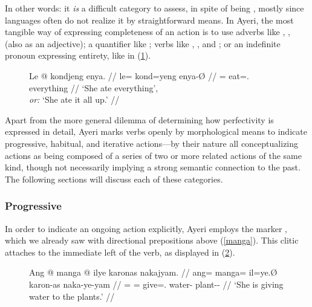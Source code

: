 In other words: it \emph{is} a difficult category to assess, in spite of being
,
mostly since languages often do not realize it by straightforward means. In
Ayeri, the most tangible way of expressing completeness of an action is to
use adverbs like , ,
 (also as an adjective); a quantifier like
; verbs like ,
, and ; or an indefinite
pronoun expressing entirety, like  in
(\ref{ex:entirepfv}).

\begin{figure}[h]
\ex\label{ex:entirepfv}\begingl
	\gla Le @ kondjeng enya. //
	\glb le= kond=yeng enya-Ø //
	\glc \PatTI{}= eat=\TsgF{}.\Aarg{} everything //
	\glft `She ate everything', \\
		\textit{or:} `She ate it all up.' //
\endgl\xe
\end{figure}

Apart from the more general dilemma of determining how perfectivity is
expressed in detail, Ayeri marks verbs openly by morphological means to
indicate progressive, habitual, and iterative actions---by their nature all
conceptualizing actions as being composed of a series of two or more related
actions of the same kind, though not necessarily implying a strong semantic
connection to the past. The following sections will discuss each of these
categories.

\subsubsection{Progressive}

In order to indicate an ongoing action explicitly, Ayeri employs the marker
, which we already saw with directional prepositions above
(\autoref{manga}). This clitic attaches to the immediate left of the verb, as
displayed in (\ref{ex:presprog}).

\begin{figure}[h]
\ex\label{ex:presprog}\begingl
	\gla Ang @ manga @ ilye karonas nakajyam. //
	\glb ang= manga= il=ye.Ø karon-as naka-ye-yam //
	\glc \AgtT{}= \Prog{}= give=\TsgF{}.\Top{} water-\Parg{} 
		plant-\Pl{}-\Dat{} //
	\glft `She is giving water to the plants.' //
\endgl\xe
\end{figure}

